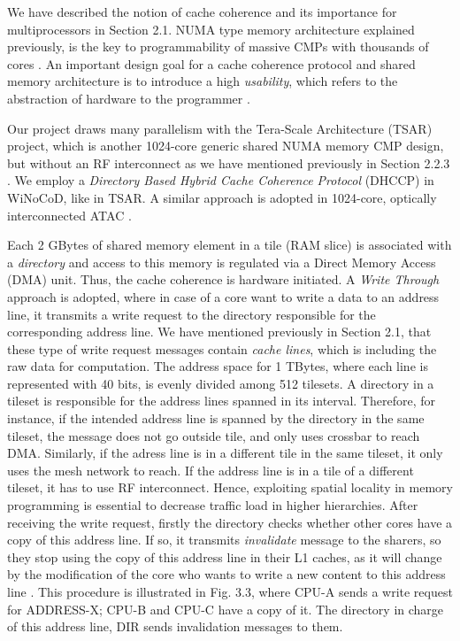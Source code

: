 We have described the notion of cache coherence and its importance for multiprocessors in Section 2.1. NUMA type memory architecture explained previously, is the key to programmability of massive CMPs with thousands of cores \cite{blagodurov2010case}. An important design goal for a cache coherence protocol and shared memory architecture is to introduce a high \textit{usability}, which refers to the abstraction of hardware to the programmer \cite{manchanda2010non}. 

Our project draws many parallelism with the Tera-Scale Architecture (TSAR) project, which is another 1024-core generic shared NUMA memory CMP design, but without an RF interconnect as we have mentioned previously in Section 2.2.3 \cite{greiner2009tsar}. We employ a \textit{Directory Based Hybrid Cache Coherence Protocol} (DHCCP) in WiNoCoD, like in TSAR. A similar approach is adopted in 1024-core, optically interconnected ATAC \cite{kurian2010atac}. 

Each 2 GBytes of shared memory element in a tile (RAM slice) is associated with a \textit{directory} and access to this memory is regulated via a Direct Memory Access (DMA) unit. Thus, the cache coherence is hardware initiated. A \textit{Write Through} approach is adopted, where in case of a core want to write a data to an address line, it transmits a write request to the directory responsible for the corresponding address line. We have mentioned previously in Section 2.1, that these type of write request messages contain \textit{cache lines}, which is including the raw data for computation. The address space for 1 TBytes, where each line is represented with 40 bits, is evenly divided among 512 tilesets. A directory in a tileset is responsible for the address lines spanned in its interval. Therefore, for instance, if the intended address line is spanned by the directory in the same tileset, the message does not go outside tile, and only uses crossbar to reach DMA. Similarly, if the adress line is in a different tile in the same tileset, it only uses the mesh network to reach. If the address line is in a tile of a different tileset, it has to use RF interconnect. Hence, exploiting spatial locality in memory programming is essential to decrease traffic load in higher hierarchies. After receiving the write request, firstly the directory checks whether other cores have a copy of this address line. If so, it transmits \textit{invalidate} message to the sharers, so they stop using the copy of this address line in their L1 caches, as it will change by the modification of the core who wants to write a new content to this address line \cite{greiner2009tsar}. This procedure is illustrated in Fig. 3.3, where CPU-A sends a write request for ADDRESS-X; CPU-B and CPU-C have a copy of it. The directory in charge of this address line, DIR sends invalidation messages to them.


